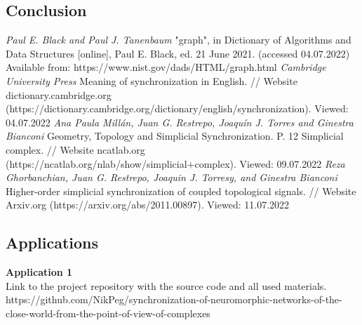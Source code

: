 \documentclass[draft]{article}
\newcommand\zz[1]{\par{\normalsize\strut #1} \hfill\ignorespaces}
\begin{document}
\newpage
\begin{center}
\section {Conclusion}
\end{center}

\newpage
\begin{center}
\begin{thebibliography}{}
 \textit{Paul E. Black and Paul J. Tanenbaum} "graph", in Dictionary of Algorithms and Data Structures [online], Paul E. Black, ed. 21 June 2021. (accessed 04.07.2022) Available from: https://www.nist.gov/dads/HTML/graph.html
 \textit{Cambridge University Press} Meaning of synchronization in English. // Website dictionary.cambridge.org (https://dictionary.cambridge.org/dictionary/english/synchronization). Viewed: 04.07.2022
 \textit{Ana Paula Millán, Juan G. Restrepo, Joaquín J. Torres and Ginestra Bianconi} Geometry, Topology and Simplicial Synchronization. P. 12
 Simplicial complex. // Website ncatlab.org (https://ncatlab.org/nlab/show/simplicial+complex). Viewed: 09.07.2022
 \textit{Reza Ghorbanchian, Juan G. Restrepo, Joaquin J. Torresy, and Ginestra Bianconi} Higher-order simplicial synchronization of coupled topological signals. // Website Arxiv.org (https://arxiv.org/abs/2011.00897). Viewed: 11.07.2022
\end{thebibliography}
\end{center}
\newpage
\begin{center}
\section {Applications}
\end{center}
\zz{}\textbf{Application 1\\}
Link to the project repository with the source code and all used materials.\\
https://github.com/NikPeg/synchronization-of-neuromorphic-networks-of-the-close-world-from-the-point-of-view-of-complexes\\
\end{document}
